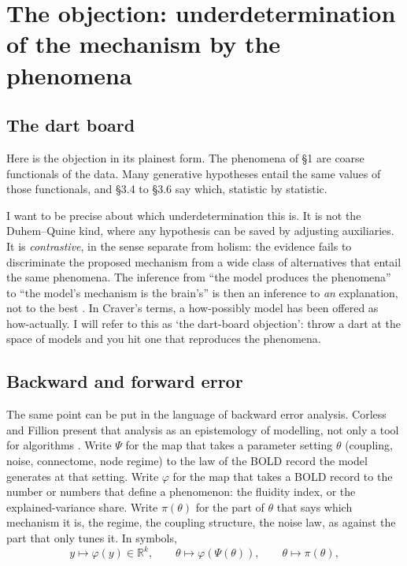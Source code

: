 \documentclass[11pt]{article}
\begin{document}
\section{The objection: underdetermination of the mechanism by the phenomena}
\subsection{The dart board}
Here is the objection in its plainest form. The phenomena of \S1 are coarse functionals of the data. Many generative hypotheses entail the same values of those functionals, and \S3.4 to \S3.6 say which, statistic by statistic.

I want to be precise about which underdetermination this is. It is not the Duhem--Quine kind, where any hypothesis can be saved by adjusting auxiliaries. It is \emph{contrastive}, in the sense \textcite{laudan1991} separate from holism: the evidence fails to discriminate the proposed mechanism from a wide class of alternatives that entail the same phenomena. The inference from ``the model produces the phenomena'' to ``the model's mechanism is the brain's'' is then an inference to \emph{an} explanation, not to the best \parencite{lipton2004}. In Craver's terms, a how-possibly model has been offered as how-actually. I will refer to this as `the dart-board objection': throw a dart at the space of models and you hit one that reproduces the phenomena.

\subsection{Backward and forward error}
The same point can be put in the language of backward error analysis. Corless and Fillion present that analysis as an epistemology of modelling, not only a tool for algorithms \parencite{corless2016,fillion2014}. Write $\Psi$ for the map that takes a parameter setting $\theta$ (coupling, noise, connectome, node regime) to the law of the BOLD record the model generates at that setting. Write $\varphi$ for the map that takes a BOLD record to the number or numbers that define a phenomenon: the fluidity index, or the explained-variance share. Write $\pi(\theta)$ for the part of $\theta$ that says which mechanism it is, the regime, the coupling structure, the noise law, as against the part that only tunes it. In symbols,
\begin{equation}
y \mapsto \varphi(y)\in\mathbb{R}^{k}, \qquad \theta \mapsto \varphi(\Psi(\theta)), \qquad \theta \mapsto \pi(\theta),
\label{eq:objects}
\end{equation}
\end{document}
